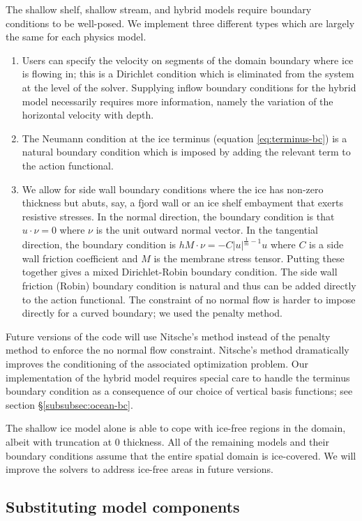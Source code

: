 \documentclass[journal abbreviation, manuscript]{copernicus}
\begin{document}
The shallow shelf, shallow stream, and hybrid models require boundary conditions to be well-posed.
We implement three different types which are largely the same for each physics model.
\begin{enumerate}
    \item Users can specify the velocity on segments of the domain boundary where ice is flowing in; this is a Dirichlet condition which is eliminated from the system at the level of the solver.
Supplying inflow boundary conditions for the hybrid model necessarily requires more information, namely the variation of the horizontal velocity with depth.
    \item The Neumann condition at the ice terminus (equation \eqref{eq:terminus-bc}) is a natural boundary condition which is imposed by adding the relevant term to the action functional.
    \item We allow for side wall boundary conditions where the ice has non-zero thickness but abuts, say, a fjord wall or an ice shelf embayment that exerts resistive stresses.
In the normal direction, the boundary condition is that $u \cdot \nu = 0$ where $\nu$ is the unit outward normal vector.
In the tangential direction, the boundary condition is $hM\cdot\nu = -C|u|^{\frac{1}{m} - 1}u$ where $C$ is a side wall friction coefficient and $M$ is the membrane stress tensor.
Putting these together gives a mixed Dirichlet-Robin boundary condition.
The side wall friction (Robin) boundary condition is natural and thus can be added directly to the action functional.
The constraint of no normal flow is harder to impose directly for a curved boundary; we used the penalty method.
\end{enumerate}
Future versions of the code will use Nitsche's method \citep{nitsche1971variationsprinzip} instead of the penalty method to enforce the no normal flow constraint.
Nitsche's method dramatically improves the conditioning of the associated optimization problem.
Our implementation of the hybrid model requires special care to handle the terminus boundary condition as a consequence of our choice of vertical basis functions; see section \S\ref{subsubsec:ocean-bc}.

The shallow ice model alone is able to cope with ice-free regions in the domain, albeit with truncation at 0 thickness.
All of the remaining models and their boundary conditions assume that the entire spatial domain is ice-covered.
We will improve the solvers to address ice-free areas in future versions.

\subsection{Substituting model components} \label{sec:physics-substitution}
\end{document}
